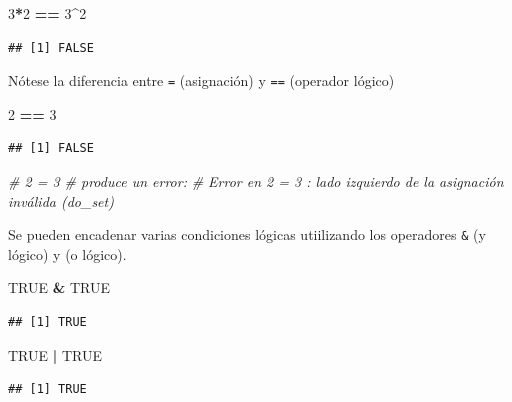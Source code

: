 \documentclass[]{book}
\newenvironment{Shaded}{\begin{snugshade}}{\end{snugshade}}
\newcommand{\DecValTok}[1]{\textcolor[rgb]{0.00,0.00,0.81}{#1}}
\newcommand{\StringTok}[1]{\textcolor[rgb]{0.31,0.60,0.02}{#1}}
\newcommand{\CommentTok}[1]{\textcolor[rgb]{0.56,0.35,0.01}{\textit{#1}}}
\newcommand{\OtherTok}[1]{\textcolor[rgb]{0.56,0.35,0.01}{#1}}
\newcommand{\OperatorTok}[1]{\textcolor[rgb]{0.81,0.36,0.00}{\textbf{#1}}}
\begin{document}
\begin{Shaded}
\begin{Highlighting}[]
\DecValTok{3}\OperatorTok{*}\DecValTok{2} \OperatorTok{==}\StringTok{ }\DecValTok{3}\OperatorTok{^}\DecValTok{2}
\end{Highlighting}
\end{Shaded}

\begin{verbatim}
## [1] FALSE
\end{verbatim}

Nótese la diferencia entre \texttt{=} (asignación) y \texttt{==}
(operador lógico)

\begin{Shaded}
\begin{Highlighting}[]
\DecValTok{2} \OperatorTok{==}\StringTok{ }\DecValTok{3}
\end{Highlighting}
\end{Shaded}

\begin{verbatim}
## [1] FALSE
\end{verbatim}

\begin{Shaded}
\begin{Highlighting}[]
\CommentTok{# 2 = 3 # produce un error:}
\CommentTok{# Error en 2 = 3 : lado izquierdo de la asignación inválida (do_set)}
\end{Highlighting}
\end{Shaded}

Se pueden encadenar varias condiciones lógicas utiilizando los
operadores \texttt{\&} (y lógico) y \texttt{\textbar{}} (o lógico).

\begin{Shaded}
\begin{Highlighting}[]
\OtherTok{TRUE} \OperatorTok{&}\StringTok{ }\OtherTok{TRUE}
\end{Highlighting}
\end{Shaded}

\begin{verbatim}
## [1] TRUE
\end{verbatim}

\begin{Shaded}
\begin{Highlighting}[]
\OtherTok{TRUE} \OperatorTok{|}\StringTok{ }\OtherTok{TRUE}
\end{Highlighting}
\end{Shaded}

\begin{verbatim}
## [1] TRUE
\end{verbatim}
\end{document}
